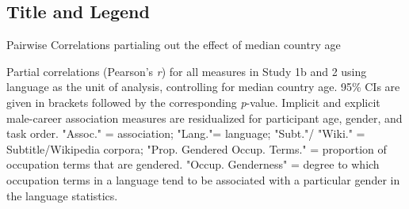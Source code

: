 \documentclass[]{article}
\begin{document}
\normalsize

\hypertarget{title-and-legend}{%
\subsection{Title and Legend}\label{title-and-legend}}

Pairwise Correlations partialing out the effect of median country age

Partial correlations (Pearson’s  \emph{r}) for all measures in Study 1b and 2 using language as the unit of analysis, controlling for median country age. 95\% CIs are given in brackets followed by the corresponding {\it p}-value. Implicit and explicit male-career association measures are residualized for participant age, gender, and task order. "Assoc." = association; "Lang."= language; "Subt."/ "Wiki." = Subtitle/Wikipedia corpora; "Prop. Gendered Occup. Terms." = proportion of occupation terms that are gendered. "Occup. Genderness" = degree to which occupation terms in a language tend to be associated with a particular gender in the language statistics.
\end{document}
